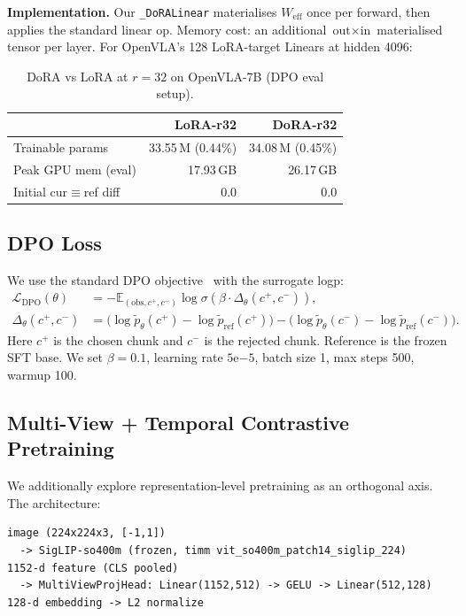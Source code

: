 \documentclass{article}
\begin{document}
\textbf{Implementation.} Our \texttt{\_DoRALinear} materialises \(W_\text{eff}\) once per forward, then applies the standard linear op. Memory cost: an additional \(\text{out}\times\text{in}\) materialised tensor per layer. For OpenVLA's 128 LoRA-target Linears at hidden 4096:

\begin{table}[ht]
\centering
\caption{DoRA vs LoRA at \(r{=}32\) on OpenVLA-7B (DPO eval setup).}
\begin{tabular}{lrr}
\toprule
& LoRA-r32 & DoRA-r32 \\
\midrule
Trainable params & 33.55\,M (0.44\%) & 34.08\,M (0.45\%) \\
Peak GPU mem (eval) & 17.93\,GB & 26.17\,GB \\
Initial cur\(\equiv\)ref diff & 0.0 & 0.0 \\
\bottomrule
\end{tabular}
\end{table}

\subsection{DPO Loss}

We use the standard DPO objective~\cite{rafailov2023direct} with the surrogate logp:
\begin{align}
\mathcal{L}_\text{DPO}(\theta) &= -\mathbb{E}_{(\text{obs}, c^+, c^-)} \log\sigma\!\left(\beta \cdot \Delta_\theta(c^+, c^-) \right), \\
\Delta_\theta(c^+, c^-) &= \big(\log\tilde{p}_\theta(c^+) - \log\tilde{p}_\text{ref}(c^+)\big) - \big(\log\tilde{p}_\theta(c^-) - \log\tilde{p}_\text{ref}(c^-)\big). \nonumber
\end{align}
Here \(c^+\) is the chosen chunk and \(c^-\) is the rejected chunk. Reference is the frozen SFT base. We set \(\beta = 0.1\), learning rate \(5\mathrm{e}{-5}\), batch size 1, max steps 500, warmup 100.

\subsection{Multi-View + Temporal Contrastive Pretraining}\label{sec:pretrain}

We additionally explore representation-level pretraining as an orthogonal axis. The architecture:

{\small
\begin{verbatim}
image (224x224x3, [-1,1])
  -> SigLIP-so400m (frozen, timm vit_so400m_patch14_siglip_224)
1152-d feature (CLS pooled)
  -> MultiViewProjHead: Linear(1152,512) -> GELU -> Linear(512,128)
128-d embedding -> L2 normalize
\end{verbatim}
}
\end{document}

